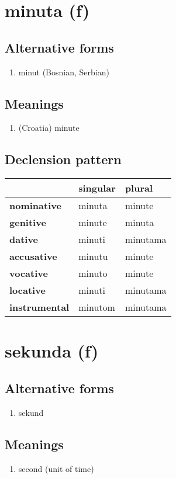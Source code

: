\filbreak
\section{minuta (f)}
\subsection*{Alternative forms}
\begin{enumerate}
\item minut (Bosnian, Serbian)
\end{enumerate}
\subsection*{Meanings}
\begin{enumerate}
\item (Croatia) minute
\end{enumerate}
\subsection*{Declension pattern}
\begin{tabularx}{\linewidth}{Xll}
\toprule
{} & singular &    plural \\
\midrule
\textbf{nominative  } &   minuta &    minute \\
\textbf{genitive    } &   minute &    minuta \\
\textbf{dative      } &   minuti &  minutama \\
\textbf{accusative  } &   minutu &    minute \\
\textbf{vocative    } &   minuto &    minute \\
\textbf{locative    } &   minuti &  minutama \\
\textbf{instrumental} &  minutom &  minutama \\
\bottomrule
\end{tabularx}

\filbreak
\section{sekunda (f)}
\subsection*{Alternative forms}
\begin{enumerate}
\item sekund
\end{enumerate}
\subsection*{Meanings}
\begin{enumerate}
\item second (unit of time)
\end{enumerate}
